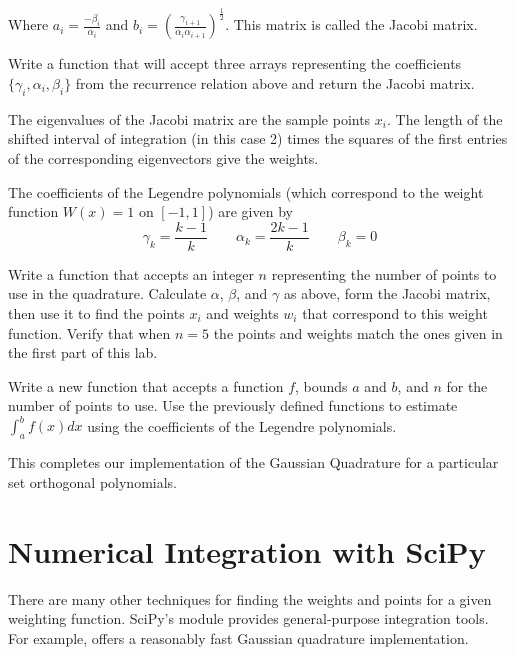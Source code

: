 Where $a_i = \frac{-\beta_i}{\alpha_i}$ and $b_i = (\frac{\gamma_{i+1}}{\alpha_i \alpha_{i+1}})^{\frac{1}{2}}$.
This matrix is called the Jacobi matrix.

\begin{problem} %
Write a function that will accept three arrays representing the coefficients $\{\gamma_i, \alpha_i, \beta_i\}$ from the recurrence relation above and return the Jacobi matrix.
\end{problem}

The eigenvalues of the Jacobi matrix are the sample points $x_i$.
The length of the shifted interval of integration (in this case 2) times the squares of the first entries of the corresponding eigenvectors give the weights.

\begin{problem} %
The coefficients of the Legendre polynomials (which correspond to the weight function $W(x) = 1$ on $[-1,1]$) are given by
\[\gamma_k = \frac{k-1}{k} \qquad \alpha_k = \frac{2k - 1}{k} \qquad \beta_k = 0\]

Write a function that accepts an integer $n$ representing the number of points to use in the quadrature. Calculate $\alpha$, $\beta$, and $\gamma$ as above, form the Jacobi matrix, then use it to find the points $x_i$ and weights $w_i$ that correspond to this weight function.
Verify that when $n=5$ the points and weights match the ones given in the first part of this lab.
\end{problem}

\begin{problem} %
Write a new function that accepts a function $f$, bounds $a$ and $b$, and $n$ for the number of points to use.
Use the previously defined functions to estimate $\int_a^b f(x)dx$ using the coefficients of the Legendre polynomials.

This completes our implementation of the Gaussian Quadrature for a particular set orthogonal polynomials.
\end{problem}

\section*{Numerical Integration with SciPy} %

There are many other techniques for finding the weights and points for a given weighting function.
SciPy's  module provides general-purpose integration tools.
For example,  offers a reasonably fast Gaussian quadrature implementation.

